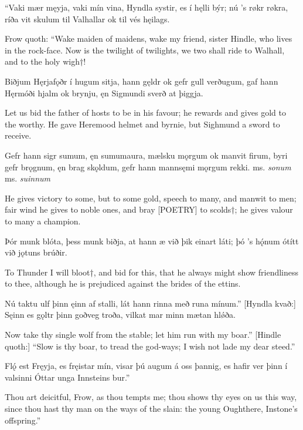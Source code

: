 “Vaki mær męyja, \hld vaki mín vina,
Hyndla systir, \hld es í hęlli býr;
nú ’s røkr røkra, \hld ríða vit skulum
til Valhallar \hld ok til vés hęilags.

Frow quoth:
“Wake maiden of maidens, wake my friend, sister Hindle, who lives in the rock-face. Now is the twilight of twilights, we two shall ride to Walhall, and to the holy wigh†!

Biðjum Hęrjafǫðr \hld í hugum sitja,
hann gęldr ok gefr \hld gull verðugum\footnotemark[1],
gaf hann Hęrmóði \hld hjalm ok brynju,
ęn Sigmundi \hld sverð at þiggja.

Let us bid the father of hosts to be in his favour; he rewards and gives gold to the worthy. He gave Heremood helmet and byrnie, but Sighmund a sword to receive.

Gefr hann sigr sumum\footnotetext[1], \hld ęn sumum\footnotetext[2] aura,
mælsku mǫrgum \hld ok manvit firum,
byri gefr brǫgnum, \hld ęn brag skǫldum,
gefr hann mannsęmi \hld mǫrgum rekki.
\footnotetext[1] ms. \emph{sonum}
\footnotetext[2] ms. \emph{suinnum}

He gives victory to some, but to some gold, speech to many, and manwit to men; fair wind he gives to noble ones, and bray [POETRY] to scolds†; he gives valour to many a champion.

Þór munk blóta, \hld þess munk biðja,
at hann æ við þik \hld einart láti;
þó ’s hǫ́num ótítt \hld við jǫtuns brúðir.

To Thunder I will bloot†, and bid for this, that he always might show friendliness to thee, although he is prejudiced against the brides of the ettins\footnotemark[1].

Nú taktu ulf þinn \hld ęinn af stalli,
lát hann rinna \hld með runa mínum.”
[Hyndla kvað:] Sęinn es gǫltr þinn \hld goðveg troða,
vilkat mar minn \hld mætan hlǿða.

Now take thy single wolf from the stable; let him run with my boar.” [Hindle quoth:] “Slow is thy boar, to tread the god-ways; I wish not lade my dear steed.”

Flǫ́ est Fręyja, \hld es fręistar mín,
visar þú augum \hld á oss þannig,
es hafir ver þinn \hld í valsinni
Óttar unga \hld Innsteins bur.”

Thou art deicitful, Frow, as thou tempts me; thou shows thy eyes on us this way, since thou hast thy man on the ways of the slain: the young Oughthere, Instone's offspring.”

